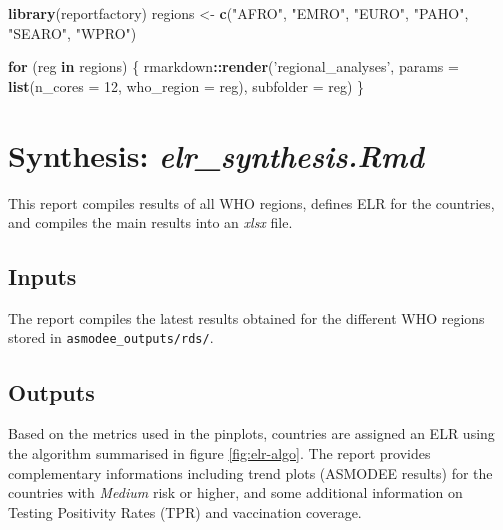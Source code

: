 \documentclass[]{book}
\newenvironment{Shaded}{\begin{snugshade}}{\end{snugshade}}
\newcommand{\ControlFlowTok}[1]{\textcolor[rgb]{0.13,0.29,0.53}{\textbf{#1}}}
\newcommand{\DataTypeTok}[1]{\textcolor[rgb]{0.13,0.29,0.53}{#1}}
\newcommand{\DecValTok}[1]{\textcolor[rgb]{0.00,0.00,0.81}{#1}}
\newcommand{\KeywordTok}[1]{\textcolor[rgb]{0.13,0.29,0.53}{\textbf{#1}}}
\newcommand{\NormalTok}[1]{#1}
\newcommand{\OperatorTok}[1]{\textcolor[rgb]{0.81,0.36,0.00}{\textbf{#1}}}
\newcommand{\StringTok}[1]{\textcolor[rgb]{0.31,0.60,0.02}{#1}}
\begin{document}
\begin{Shaded}
\begin{Highlighting}[]

\KeywordTok{library}\NormalTok{(reportfactory)}
\NormalTok{regions <-}\StringTok{ }\KeywordTok{c}\NormalTok{(}\StringTok{"AFRO"}\NormalTok{, }\StringTok{"EMRO"}\NormalTok{, }\StringTok{"EURO"}\NormalTok{, }\StringTok{"PAHO"}\NormalTok{, }\StringTok{"SEARO"}\NormalTok{, }\StringTok{"WPRO"}\NormalTok{)}

\ControlFlowTok{for}\NormalTok{ (reg }\ControlFlowTok{in}\NormalTok{ regions) \{}
\NormalTok{rmarkdown}\OperatorTok{::}\KeywordTok{render}\NormalTok{(}\StringTok{'regional_analyses'}\NormalTok{,}
                  \DataTypeTok{params =} \KeywordTok{list}\NormalTok{(}\DataTypeTok{n_cores =} \DecValTok{12}\NormalTok{, }\DataTypeTok{who_region =}\NormalTok{ reg),}
                  \DataTypeTok{subfolder =}\NormalTok{ reg)}
\NormalTok{\}}
\end{Highlighting}
\end{Shaded}

\hypertarget{synthesis-elr_synthesis.rmd}{%
\section{\texorpdfstring{Synthesis: \emph{elr\_synthesis.Rmd}}{Synthesis: elr\_synthesis.Rmd}}\label{synthesis-elr_synthesis.rmd}}

This report compiles results of all WHO regions, defines ELR for the countries,
and compiles the main results into an \emph{xlsx} file.

\hypertarget{inputs-2}{%
\subsection{Inputs}\label{inputs-2}}

The report compiles the latest results obtained for the different WHO regions
stored in \texttt{asmodee\_outputs/rds/}.

\hypertarget{outputs-2}{%
\subsection{Outputs}\label{outputs-2}}

Based on the metrics used in the pinplots, countries are assigned an ELR using
the algorithm summarised in figure \ref{fig:elr-algo}. The report provides
complementary informations including trend plots (ASMODEE results) for the
countries with \emph{Medium} risk or higher, and some additional information on
Testing Positivity Rates (TPR) and vaccination coverage.
\end{document}
